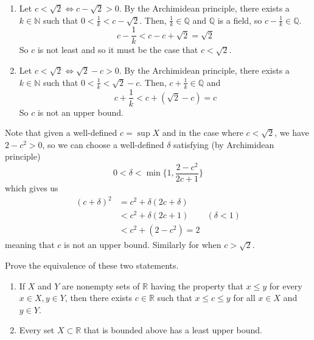 \documentclass{article}
\begin{document}
\begin{solution}
    \begin{enumerate}
        \item Let $c < \sqrt{2} \iff c - \sqrt{2} > 0$. By the Archimidean principle, there exists a $k \in \mathbb{N}$ such that $0 < \frac{1}{k} < c - \sqrt{2}$. Then, $\frac{1}{k} \in \mathbb{Q}$ and $\mathbb{Q}$ is a field, so $c - \frac{1}{k} \in \mathbb{Q}$. 
        \[c - \frac{1}{k} < c - c + \sqrt{2} = \sqrt{2}\]
        So $c$ is not least and so it must be the case that $c < \sqrt{2}$. 
        \item Let $c < \sqrt{2} \iff \sqrt{2} - c > 0$. By the Archimidean principle, there exists a $k \in \mathbb{N}$ such that $0 < \frac{1}{k} < \sqrt{2} - c$. Then, $c + \frac{1}{k} \in \mathbb{Q}$ and 
        \[c + \frac{1}{k} < c + (\sqrt{2} - c) = c\]
        So $c$ is not an upper bound. 
    \end{enumerate}
    Note that given a well-defined $c = \sup{X}$ and in the case where $c < \sqrt{2}$, we have $2 - c^2 > 0$, so we can choose a well-defined $\delta$ satisfying (by Archimidean principle) 
    \[0 < \delta < \min \bigg\{1, \frac{2 - c^2}{2c + 1} \bigg\} \]
    which gives us 
    \begin{align*}
        (c + \delta)^2 & = c^2 + \delta(2c + \delta) & \\
        & < c^2 + \delta (2 c + 1) & (\delta < 1) \\
        & < c^2 + (2 - c^2) = 2 & 
    \end{align*}
    meaning that $c$ is not an upper bound. Similarly for when $c > \sqrt{2}$. 
    \end{solution}

    \begin{exercise}[Zorich 2.2.15]
    Prove the equivalence of these two statements. 
    \begin{enumerate}
        \item If $X$ and $Y$ are nonempty sets of $\mathbb{R}$ having the property that $x \leq y$ for every $x \in X, y \in Y$, then there exists $c \in \mathbb{R}$ such that $x \leq c \leq y$ for all $x \in X$ and $y \in Y$. 
        \item Every set $X \subset \mathbb{R}$ that is bounded above has a least upper bound. 
    \end{enumerate}
    \end{exercise}
\end{document}
